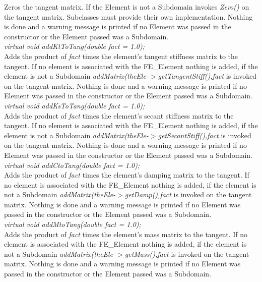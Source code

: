 Zeros the tangent matrix. If the Element is not a Subdomain invokes
{\em Zero()} on the tangent matrix. Subclasses must provide their own
implementation. Nothing is done and a warning message is printed if no
Element was passed in the constructor or the Element passed was a
Subdomain. \\ 


{\em virtual void addKtToTang(double fact = 1.0); }\\
Adds the product of {\em fact} times the element's tangent stiffness
matrix to the tangent. If no element is associated with the
FE\_Element nothing is added, if the element is not a Subdomain {\em
addMatrix(theEle-$>$getTangentStiff(),fact} is invoked on the tangent
matrix. Nothing is done and a warning message is printed if no Element
was passed in the constructor or the Element passed was a
Subdomain. \\  

{\em virtual void addKsToTang(double fact = 1.0); }\\
Adds the product of {\em fact} times the element's secant stiffness
matrix to the tangent. If no element is associated with the
FE\_Element nothing is added, if the element is not a Subdomain {\em
addMatrix(theEle-$>$getSecantStiff(),fact} is invoked on the tangent
matrix. Nothing is done and a warning message is printed if no Element
was passed in the constructor or the Element passed was a
Subdomain. \\  


{\em virtual void addCtoTang(double fact = 1.0); }\\
Adds the product of {\em fact} times the element's damping
matrix to the tangent. If no element is associated with the
FE\_Element nothing is added, if the element is not a Subdomain 
{\em addMatrix(theEle-$>$getDamp(),fact} is invoked on the tangent
matrix. Nothing is done and a warning message is printed if no Element was
passed in the constructor or the Element passed was a Subdomain. \\  


{\em virtual void addMtoTang(double fact = 1.0); }\\
Adds the product of {\em fact} times the element's mass
matrix to the tangent. If no element is associated with the
FE\_Element nothing is added, if the element is not a Subdomain 
{\em addMatrix(theEle-$>$getMass(),fact} is invoked on the tangent
matrix. Nothing is done and a warning message is printed if no Element was
passed in the constructor or the Element passed was a Subdomain. \\  

